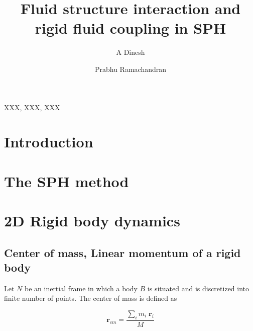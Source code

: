 \documentclass[preprint,12pt]{elsarticle}
\newcommand{\ten}[1]{\ensuremath{\mathbf{#1}}}
\begin{document}
\begin{frontmatter}

  \title{Fluid structure interaction and rigid fluid coupling in SPH}
  \author[IITB]{A Dinesh}
  \author[IITB]{Prabhu Ramachandran}
  \address[IITB]{Department of Aerospace Engineering, Indian Institute of
    Technology Bombay, Powai, Mumbai 400076}


\begin{abstract}
\end{abstract}

\begin{keyword}
{XXX}, {XXX}, {XXX}


\end{keyword}

\end{frontmatter}




\section{Introduction}
\label{sec:intro}


\section{The SPH method}
\label{sec:sph}


\section{2D Rigid body dynamics}
\label{sec:rb-2d}


\subsection{Center of mass, Linear momentum of a rigid body}
\label{sec:center-mass}

Let $N$ be an inertial frame in which a body $B$ is situated and is
discretized into finite number of points. The center of mass is defined as \cite{rao2006dynamics}


\begin{equation}
  \label{eq:center-of-mass}
  \ten{r}_{cm} = \frac{\sum_i m_i \; \ten{r}_i}{M}
\end{equation}
\end{document}

